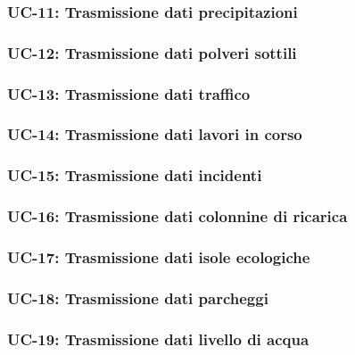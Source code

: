 \subsubsection{UC-11: Trasmissione dati precipitazioni}

\subsubsection{UC-12: Trasmissione dati polveri sottili}

\subsubsection{UC-13: Trasmissione dati traffico}

\subsubsection{UC-14: Trasmissione dati lavori in corso}

\subsubsection{UC-15: Trasmissione dati incidenti}

\subsubsection{UC-16: Trasmissione dati colonnine di ricarica}

\subsubsection{UC-17: Trasmissione dati isole ecologiche}

\subsubsection{UC-18: Trasmissione dati parcheggi}

\subsubsection{UC-19: Trasmissione dati livello di acqua}




